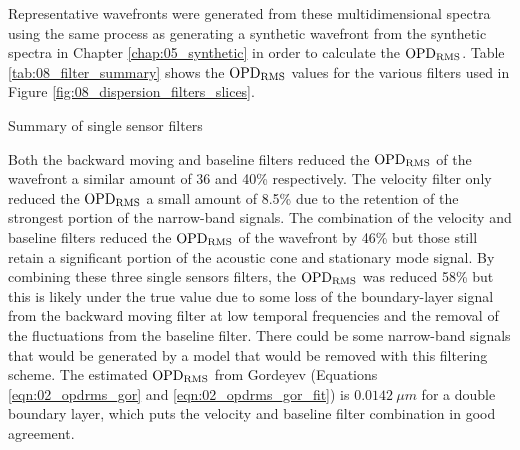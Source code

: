 Representative wavefronts were generated from these multidimensional spectra using the same process as generating a synthetic wavefront from the synthetic spectra in Chapter \ref{chap:05_synthetic} in order to calculate the $\operatorname{OPD_{RMS}}$.
Table \ref{tab:08_filter_summary} shows the $\operatorname{OPD_{RMS}}$ values for the various filters used in Figure \ref{fig:08_dispersion_filters_slices}.
\begin{table}
  \centering
  \caption{Summary of single sensor filters}
  
  \label{tab:08_filter_summary}
\end{table}
Both the backward moving and baseline filters reduced the $\operatorname{OPD_{RMS}}$ of the wavefront a similar amount of 36 and 40\% respectively.
The velocity filter only reduced the $\operatorname{OPD_{RMS}}$ a small amount of 8.5\% due to the retention of the strongest portion of the narrow-band signals.
The combination of the velocity and baseline filters reduced the $\operatorname{OPD_{RMS}}$ of the wavefront by 46\% but those still retain a significant portion of the acoustic cone and stationary mode signal.
By combining these three single sensors filters, the $\operatorname{OPD_{RMS}}$ was reduced 58\% but this is likely under the true value due to some loss of the boundary-layer signal from the backward moving filter at low temporal frequencies and the removal of the fluctuations from the baseline filter.
There could be some narrow-band signals that would be generated by a model that would be removed with this filtering scheme.
The estimated $\operatorname{OPD_{RMS}}$ from Gordeyev \cite{Gordeyev-2014-jcJndkHM} (Equations \ref{eqn:02_opdrms_gor} and \ref{eqn:02_opdrms_gor_fit}) is $0.0142\ \mu m$ for a double boundary layer, which puts the velocity and baseline filter combination in good agreement.
